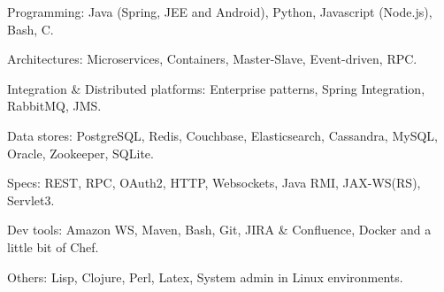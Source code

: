 \begin{rlist}
  \item Programming: Java (Spring, JEE and Android), Python, Javascript (Node.js),
  Bash, C.
  \item Architectures: Microservices, Containers, Master-Slave, Event-driven, RPC.
  \item Integration \& Distributed platforms: Enterprise patterns, Spring Integration, RabbitMQ, JMS.
  \item Data stores: PostgreSQL, Redis, Couchbase, Elasticsearch, Cassandra, MySQL, Oracle, Zookeeper, SQLite.
  \item Specs: REST, RPC, OAuth2, HTTP, Websockets, Java RMI, JAX-WS(RS), Servlet3.
  \item Dev tools: Amazon WS, Maven, Bash, Git, JIRA \& Confluence, Docker and a little bit of Chef.
  \item Others: Lisp, Clojure, Perl, Latex, System admin in Linux environments.
\end{rlist}

